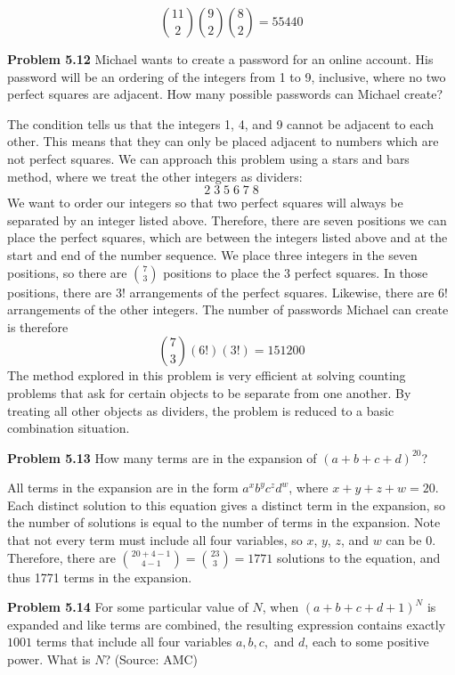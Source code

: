 \documentclass[11pt]{scrartcl}
\begin{document}
$${11 \choose 2}{9 \choose 2}{8 \choose 2}=55440$$
\begin{tcolorbox}
\textbf{Problem 5.12} Michael wants to create a password for an online account. His password will be an ordering of the integers from 1 to 9, inclusive, where no two perfect squares are adjacent. How many possible passwords can Michael create?
\end{tcolorbox}
 The condition tells us that the integers 1, 4, and 9 cannot be adjacent to each other. This means that they can only be placed adjacent to numbers which are not perfect squares. We can approach this problem using a stars and bars method, where we treat the other integers as dividers: 
$$2\;3\;5\;6\;7\;8$$
We want to order our integers so that two perfect squares will always be separated by an integer listed above. Therefore, there are seven positions we can place the perfect squares, which are between the integers listed above and at the start and end of the number sequence. We place three integers in the seven positions, so there are $7 \choose 3$ positions to place the 3 perfect squares. In those positions, there are $3!$ arrangements of the perfect squares. Likewise, there are $6!$ arrangements of the other integers. The number of passwords Michael can create is therefore
$${{7 \choose 3}}(6!)(3!)=151200$$
\noindent 
The method explored in this problem is very efficient at solving counting problems that ask for certain objects to be separate from one another. By treating all other objects as dividers, the problem is reduced to a basic combination situation. \\
\begin{tcolorbox}
\textbf{Problem 5.13} How many terms are in the expansion of $(a+b+c+d)^{20}$?
\end{tcolorbox}
\noindent
All terms in the expansion are in the form $a^xb^yc^zd^w$, where $x+y+z+w=20$. Each distinct solution to this equation gives a distinct term in the expansion, so the number of solutions is equal to the number of terms in the expansion. Note that not every term must include all four variables, so $x$, $y$, $z$, and $w$ can be 0. Therefore, there are ${{20+4-1} \choose {4-1}}={23 \choose 3}=1771$ solutions to the equation, and thus 1771 terms in the expansion. 
\\
\begin{tcolorbox}
\textbf{Problem 5.14} For some particular value of $N$, when $(a+b+c+d+1)^N$ is expanded and like terms are combined, the resulting expression contains exactly $1001$ terms that include all four variables $a, b,c,$ and $d$, each to some positive power. What is $N$? (Source: AMC)
\end{tcolorbox}
\end{document}
